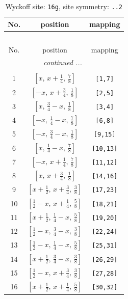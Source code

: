 \documentclass[fleqn,8pt]{jsarticle}
\begin{document}
\renewcommand{\arraystretch}{1.2}
\begin{longtable}{ccc}
\caption{Wyckoff site: {\tt 16g}, site symmetry: {\tt ..2}}
 \\
 \hline \hline
No. & position & mapping \\ \hline \endfirsthead

\multicolumn{2}{l}{\tablename\ \thetable{}} \\
 \hline \hline
No. & position & mapping \\ \hline \endhead

 \hline \hline
\multicolumn{2}{r}{\footnotesize\it continued ...} \\ \endfoot

 \hline \hline
\multicolumn{2}{r}{} \\ \endlastfoot

1 & $\left[ x,\, x + \frac{1}{4},\, \frac{7}{8} \right]$ & {\tt [1,7]} \\ \hline
2 & $\left[ - x,\, x + \frac{3}{4},\, \frac{1}{8} \right]$ & {\tt [2,5]} \\ \hline
3 & $\left[ x,\, \frac{3}{4} - x,\, \frac{1}{8} \right]$ & {\tt [3,4]} \\ \hline
4 & $\left[ - x,\, \frac{1}{4} - x,\, \frac{7}{8} \right]$ & {\tt [6,8]} \\ \hline
5 & $\left[ - x,\, \frac{3}{4} - x,\, \frac{1}{8} \right]$ & {\tt [9,15]} \\ \hline
6 & $\left[ x,\, \frac{1}{4} - x,\, \frac{7}{8} \right]$ & {\tt [10,13]} \\ \hline
7 & $\left[ - x,\, x + \frac{1}{4},\, \frac{7}{8} \right]$ & {\tt [11,12]} \\ \hline
8 & $\left[ x,\, x + \frac{3}{4},\, \frac{1}{8} \right]$ & {\tt [14,16]} \\ \hline
9 & $\left[ x + \frac{1}{2},\, x + \frac{3}{4},\, \frac{3}{8} \right]$ & {\tt [17,23]} \\ \hline
10 & $\left[ \frac{1}{2} - x,\, x + \frac{1}{4},\, \frac{5}{8} \right]$ & {\tt [18,21]} \\ \hline
11 & $\left[ x + \frac{1}{2},\, \frac{1}{4} - x,\, \frac{5}{8} \right]$ & {\tt [19,20]} \\ \hline
12 & $\left[ \frac{1}{2} - x,\, \frac{3}{4} - x,\, \frac{3}{8} \right]$ & {\tt [22,24]} \\ \hline
13 & $\left[ \frac{1}{2} - x,\, \frac{1}{4} - x,\, \frac{5}{8} \right]$ & {\tt [25,31]} \\ \hline
14 & $\left[ x + \frac{1}{2},\, \frac{3}{4} - x,\, \frac{3}{8} \right]$ & {\tt [26,29]} \\ \hline
15 & $\left[ \frac{1}{2} - x,\, x + \frac{3}{4},\, \frac{3}{8} \right]$ & {\tt [27,28]} \\ \hline
16 & $\left[ x + \frac{1}{2},\, x + \frac{1}{4},\, \frac{5}{8} \right]$ & {\tt [30,32]} \\
\end{longtable}
\end{document}
